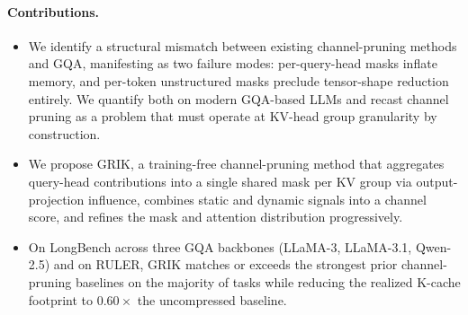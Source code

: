 \documentclass{article}
\begin{document}

\paragraph{Contributions.}
\begin{itemize}
  \item We identify a structural mismatch between existing channel-pruning methods and GQA, manifesting as two failure modes: per-query-head masks inflate memory, and per-token unstructured masks preclude tensor-shape reduction entirely. We quantify both on modern GQA-based LLMs and recast channel pruning as a problem that must operate at KV-head group granularity by construction.
  \item We propose GRIK, a training-free channel-pruning method that aggregates query-head contributions into a single shared mask per KV group via output-projection influence, combines static and dynamic signals into a channel score, and refines the mask and attention distribution progressively.
  \item On LongBench across three GQA backbones (LLaMA-3, LLaMA-3.1, Qwen-2.5) and on RULER, GRIK matches or exceeds the strongest prior channel-pruning baselines on the majority of tasks while reducing the realized K-cache footprint to $0.60\times$ the uncompressed baseline.
\end{itemize}


 
\end{document}
